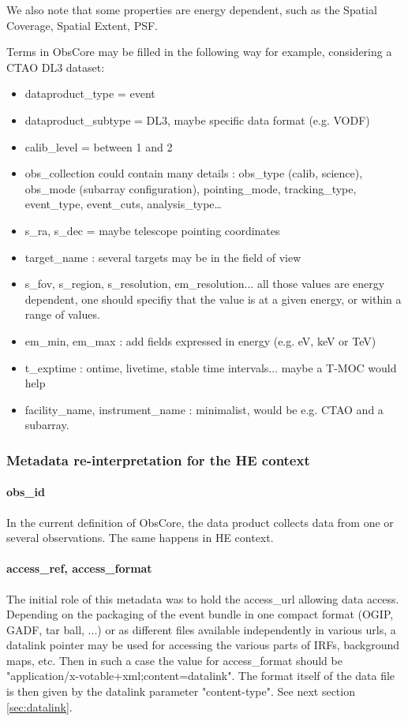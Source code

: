 \documentclass[11pt,a4paper]{ivoa}
\begin{document}
We also note that some properties are energy dependent, such as the Spatial Coverage, Spatial Extent, \gls{PSF}.

Terms in ObsCore may be filled in the following way for example, considering a \gls{CTAO} DL3 dataset:

\begin{itemize}
    \item dataproduct\_type = event
    \item dataproduct\_subtype = DL3, maybe specific data format (e.g. \gls{VODF})
    \item calib\_level = between 1 and 2
    \item obs\_collection could contain many details : obs\_type (calib, science), obs\_mode (subarray
configuration), pointing\_mode, tracking\_type, event\_type, event\_cuts, analysis\_type…
    \item s\_ra, s\_dec = maybe telescope pointing coordinates
    \item target\_name : several targets may be in the field of view
    \item s\_fov, s\_region, s\_resolution, em\_resolution... all those values are energy dependent, one should specifiy that the value is at a given energy, or within a range of values.
    \item em\_min, em\_max : add fields expressed in energy (e.g. eV, keV or TeV)
    \item t\_exptime : ontime, livetime, stable time intervals... maybe a T-MOC would help
    \item facility\_name, instrument\_name : minimalist, would be e.g. \gls{CTAO} and a subarray.
\end{itemize}


\subsubsection{Metadata re-interpretation for the HE context}

\paragraph{obs\_id}
In the current definition of ObsCore, the data product collects data from one or several observations. The same happens in \gls{HE} context.

\paragraph{access\_ref, access\_format}
The initial role of this metadata was to hold the access\_url allowing data access.
Depending on the packaging of the event bundle in one compact format (\gls{OGIP}, \gls{GADF}, tar ball, ...)
or as different files available independently in various urls, a datalink pointer may be used for accessing the various parts of \gls{IRF}s, background maps, etc.
Then in such a case the value for access\_format should be "application/x-votable+xml;content=datalink". The format itself of the data file is then given by the datalink parameter "content-type".
See next section \ref{sec:datalink}.
\end{document}
